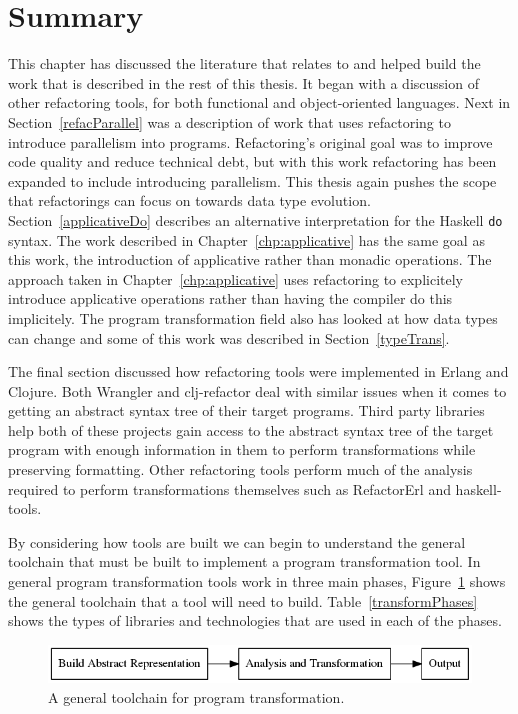 \section{Summary}

This chapter has discussed the literature that relates to and helped build the work that is described in the rest of this thesis. It began with a discussion of other refactoring tools, for both functional and object-oriented languages. Next in Section~\ref{refacParallel} was a description of work that uses refactoring to introduce parallelism into programs. Refactoring's original goal was to improve code quality and reduce technical debt, but with this work refactoring has been expanded to include introducing parallelism. This thesis again pushes the scope that refactorings can focus on towards data type evolution. Section~\ref{applicativeDo} describes an alternative interpretation for the Haskell \texttt{do} syntax. The work described in Chapter~\ref{chp:applicative} has the same goal as this work, the introduction of applicative rather than monadic operations. The approach taken in Chapter~\ref{chp:applicative} uses refactoring to explicitely introduce applicative operations rather than having the compiler do this implicitely. The program transformation field also has looked at how data types can change and some of this work was described in Section~\ref{typeTrans}. 

The final section discussed how refactoring tools were implemented in Erlang and Clojure. Both Wrangler and clj-refactor deal with similar issues when it comes to getting an abstract syntax tree of their target programs. Third party libraries help both of these projects gain access to the abstract syntax tree of the target program with enough information in them to perform transformations while preserving formatting. Other refactoring tools perform much of the analysis required to perform transformations themselves such as RefactorErl and haskell-tools.

By considering how tools are built we can begin to understand the general toolchain that must be built to implement a program transformation tool. In general program transformation tools work in three main phases, Figure~\ref{generalToolchain} shows the general toolchain that a tool will need to build. Table~\ref{transformPhases} shows the types of libraries and technologies that are used in each of the phases. 

\begin{figure}[t]
	\begin{center}
		\includegraphics[scale=.4]{graphVis/RelatedWork/abstractTooling.png}
	\end{center}
	\caption{A general toolchain for program transformation.}
	\label{generalToolchain}
\end{figure}

